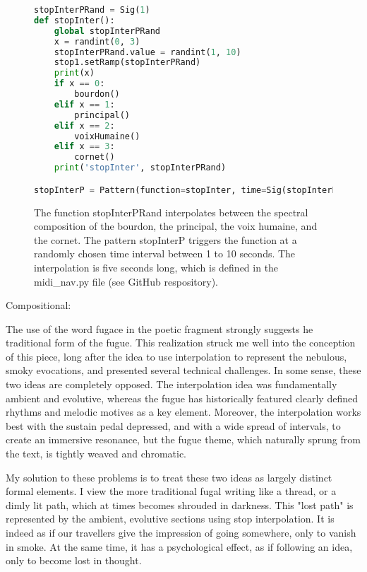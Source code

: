 \documentclass[12pt,twoside,maitrise]{dms}
\theoremstyle{definition}
\begin{document}
\begin{figure}[H]
\begin{lstlisting}[language=Python]
stopInterPRand = Sig(1)
def stopInter():
    global stopInterPRand
    x = randint(0, 3)
    stopInterPRand.value = randint(1, 10)
    stop1.setRamp(stopInterPRand)
    print(x)
    if x == 0:
        bourdon()
    elif x == 1:
        principal()
    elif x == 2:
        voixHumaine()
    elif x == 3:
        cornet()
    print('stopInter', stopInterPRand)

stopInterP = Pattern(function=stopInter, time=Sig(stopInterPRand))
\end{lstlisting}
\caption{The function stopInterPRand interpolates between the spectral composition of the bourdon, the principal, the voix humaine, and the cornet.
The pattern stopInterP triggers the function at a randomly chosen time interval between 1 to 10 seconds.
The interpolation is five seconds long, which is defined in the midi\_nav.py file (see GitHub respository).}
\end{figure}

Compositional:

The use of the word fugace in the poetic fragment strongly suggests he traditional form of the fugue.
This realization struck me well into the conception of this piece, long after the idea to use interpolation to represent the nebulous, smoky evocations, and presented several technical challenges.
In some sense, these two ideas are completely opposed.
The interpolation idea was fundamentally ambient and evolutive, whereas the fugue has historically featured clearly defined rhythms and melodic motives as a key element.
Moreover, the interpolation works best with the sustain pedal depressed, and with a wide spread of intervals, to create an immersive resonance, but the fugue theme, which naturally sprung from the text, is tightly weaved and chromatic.

My solution to these problems is to treat these two ideas as largely distinct formal elements.
I view the more traditional fugal writing like a thread, or a dimly lit path, which at times becomes shrouded in darkness.
This "lost path" is represented by the ambient, evolutive sections using stop interpolation.
It is indeed as if our travellers give the impression of going somewhere, only to vanish in smoke.
At the same time, it has a psychological effect, as if following an idea, only to become lost in thought.
\end{document}
